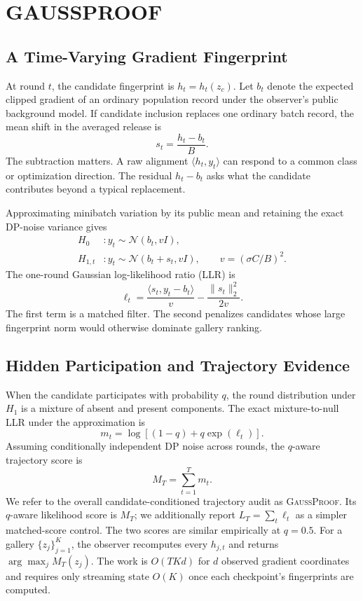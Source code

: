\documentclass[conference]{IEEEtran}
\newcommand{\method}{\textsc{GaussProof}}
\newcommand{\Normal}{\mathcal{N}}
\begin{document}
\section{GAUSSPROOF}

\subsection{A Time-Varying Gradient Fingerprint}

At round $t$, the candidate fingerprint is $h_t=h_t(z_c)$. Let $b_t$ denote the expected clipped gradient of an ordinary population record under the observer's public background model. If candidate inclusion replaces one ordinary batch record, the mean shift in the averaged release is
\begin{equation}
s_t=\frac{h_t-b_t}{B}.
\label{eq:shift}
\end{equation}
The subtraction matters. A raw alignment $\langle h_t,y_t\rangle$ can respond to a common class or optimization direction. The residual $h_t-b_t$ asks what the candidate contributes beyond a typical replacement.

Approximating minibatch variation by its public mean and retaining the exact DP-noise variance gives
\begin{align}
H_0 &: y_t\sim\Normal(b_t,vI),\\
H_{1,t} &: y_t\sim\Normal(b_t+s_t,vI),
\qquad v=(\sigma C/B)^2.
\end{align}
The one-round Gaussian log-likelihood ratio (LLR) is
\begin{equation}
\ell_t=\frac{\langle s_t,y_t-b_t\rangle}{v}
-\frac{\lVert s_t\rVert_2^2}{2v}.
\label{eq:llr}
\end{equation}
The first term is a matched filter. The second penalizes candidates whose large fingerprint norm would otherwise dominate gallery ranking.

\subsection{Hidden Participation and Trajectory Evidence}

When the candidate participates with probability $q$, the round distribution under $H_1$ is a mixture of absent and present components. The exact mixture-to-null LLR under the approximation is
\begin{equation}
m_t=\log\left[(1-q)+q\exp(\ell_t)\right].
\label{eq:mixture}
\end{equation}
Assuming conditionally independent DP noise across rounds, the $q$-aware trajectory score is
\begin{equation}
M_T=\sum_{t=1}^{T}m_t.
\label{eq:trajectory}
\end{equation}
We refer to the overall candidate-conditioned trajectory audit as \method. Its $q$-aware likelihood score is $M_T$; we additionally report $L_T=\sum_t\ell_t$ as a simpler matched-score control. The two scores are similar empirically at $q=0.5$. For a gallery $\{z_j\}_{j=1}^K$, the observer recomputes every $h_{j,t}$ and returns $\arg\max_j M_T(z_j)$. The work is $O(TKd)$ for $d$ observed gradient coordinates and requires only streaming state $O(K)$ once each checkpoint's fingerprints are computed.
\end{document}
